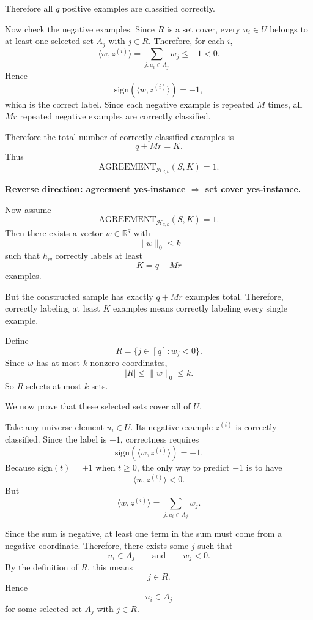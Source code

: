 \documentclass[11pt]{article}
\newcommand{\sign}{\mathrm{sign}}
\begin{document}
\begin{enumerate}
\begin{solutionbox}
        Therefore all $q$ positive examples are classified correctly.

        Now check the negative examples. Since $R$ is a set cover, every $u_i\in U$ belongs to
        at least one selected set $A_j$ with $j\in R$. Therefore, for each $i$,
        \[
        \langle w,z^{(i)}\rangle
        =
        \sum_{j:u_i\in A_j}w_j
        \le -1
        <0.
        \]
        Hence
        \[
        \sign(\langle w,z^{(i)}\rangle)=-1,
        \]
        which is the correct label. Since each negative example is repeated $M$ times, all $Mr$
        repeated negative examples are correctly classified.

        Therefore the total number of correctly classified examples is
        \[
        q+Mr=K.
        \]
        Thus
        \[
        \mathrm{AGREEMENT}_{\mathcal{H}_{d,k}}(S,K)=1.
        \]

        \medskip

        \textbf{Reverse direction: agreement yes-instance $\Rightarrow$ set cover yes-instance.}

        Now assume
        \[
        \mathrm{AGREEMENT}_{\mathcal{H}_{d,k}}(S,K)=1.
        \]
        Then there exists a vector $w\in\mathbb{R}^q$ with
        \[
        \|w\|_0\le k
        \]
        such that $h_w$ correctly labels at least
        \[
        K=q+Mr
        \]
        examples.

        But the constructed sample has exactly $q+Mr$ examples total. Therefore, correctly
        labeling at least $K$ examples means correctly labeling every single example.

        Define
        \[
        R=\{j\in[q]:w_j<0\}.
        \]
        Since $w$ has at most $k$ nonzero coordinates,
        \[
        |R|\le \|w\|_0\le k.
        \]
        So $R$ selects at most $k$ sets.

        We now prove that these selected sets cover all of $U$.

        Take any universe element $u_i\in U$. Its negative example $z^{(i)}$ is correctly
        classified. Since the label is $-1$, correctness requires
        \[
        \sign(\langle w,z^{(i)}\rangle)=-1.
        \]
        Because $\sign(t)=+1$ when $t\ge 0$, the only way to predict $-1$ is to have
        \[
        \langle w,z^{(i)}\rangle<0.
        \]
        But
        \[
        \langle w,z^{(i)}\rangle
        =
        \sum_{j:u_i\in A_j}w_j.
        \]

        Since the sum is negative, at least one term in the sum must come from a negative
        coordinate. Therefore, there exists some $j$ such that
        \[
        u_i\in A_j
        \qquad\text{and}\qquad
        w_j<0.
        \]
        By the definition of $R$, this means
        \[
        j\in R.
        \]
        Hence
        \[
        u_i\in A_j
        \]
        for some selected set $A_j$ with $j\in R$.


\end{solutionbox}
\end{enumerate}
\end{document}
